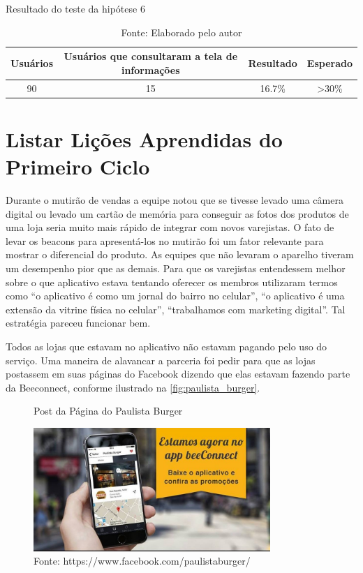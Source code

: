 \begin{table}[H]
\centering
\caption{Resultado do teste da hipótese 6}
\label{tab:resultado_6}
\begin{tabular}{|c|c|c|c|}
\hline
Usuários & Usuários que consultaram a tela de informações & Resultado & Esperado \\ \hline
90       & 15  & 16.7\%   & \textgreater 30\% \\ \hline
\end{tabular}
\caption* {Fonte: Elaborado pelo autor}    
\end{table}

\section{Listar Lições Aprendidas do Primeiro Ciclo}
\label{cha:listar_licoes_aprendidas}
Durante o mutirão de vendas a equipe notou que se tivesse levado uma câmera digital ou levado um cartão de memória para conseguir as fotos dos produtos de uma loja seria muito mais rápido de integrar com novos varejistas.
O fato de levar os beacons para apresentá-los no mutirão foi um fator relevante para mostrar o diferencial do produto. As equipes que não levaram o aparelho tiveram um desempenho pior que as demais.
Para que os varejistas entendessem melhor sobre o que aplicativo estava tentando oferecer os membros utilizaram termos como \enquote{o aplicativo é como um jornal do bairro no celular}, \enquote{o aplicativo é uma extensão da vitrine física no celular}, \enquote{trabalhamos com marketing digital}. Tal estratégia pareceu funcionar bem.

Todos as lojas que estavam no aplicativo não estavam pagando pelo uso do serviço. Uma maneira de alavancar a parceria foi pedir para que as lojas postassem em suas páginas do Facebook dizendo que elas estavam fazendo parte da Beeconnect, conforme ilustrado na \autoref{fig:paulista_burger}.

\begin{figure}[H]
\caption{Post da Página do Paulista Burger}
\centerline{\includegraphics[width=0.8\textwidth]{img/paulista_burger}}
\label{fig:paulista_burger}
\caption* {Fonte: https://www.facebook.com/paulistaburger/}
\end{figure}

